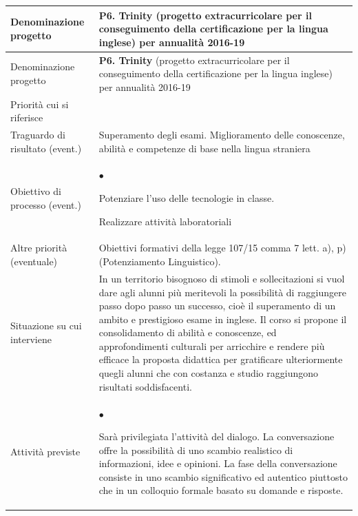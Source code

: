 \documentclass[12pt,a4paper,oneside]{memoir}
\newenvironment{elenco}{\begin{list}{$\bullet$}{%
              \setlength{\leftmargin}{4mm}%
              \setlength{\rightmargin}{1mm}%
               \setlength{\itemindent}{0mm}%
               \setlength{\labelwidth}{2mm}%
               \setlength{\labelsep}{2mm}%
              \setlength{\itemsep}{-\parsep}%
              \setlength{\partopsep}{0pt}%
              \setlength{\topsep}{0pt}%
             \setlength{\parskip}{0pt}%
              }}{\end{list}}
\begin{document}
\vspace{24pt}

\begin{footnotesize}
\begin{longtable}{|>{\raggedright}p{2.5cm}|>{\raggedright\arraybackslash}P{10cm}|}
\hline
{}
\label{P6}Denominazione progetto&\textbf{P6. Trinity} (progetto extracurricolare per il conseguimento della certificazione per la lingua inglese) per annualità 2016-19\\ \hline \endfirsthead
\hline
{}
Denominazione progetto&\textbf{P6. Trinity} (progetto extracurricolare per il conseguimento della certificazione per la lingua inglese) per annualità 2016-19\\ \hline \endhead
{}
\endfoot
\hline
\endlastfoot
Priorità cui si riferisce&\\ \hline
Traguardo di risultato (event.)&Superamento degli esami. Miglioramento delle conoscenze, abilità e competenze di base nella lingua straniera\\ \hline
Obiettivo di processo (event.)&
\begin{elenco}
\item Potenziare l'uso delle tecnologie in classe.
\item Realizzare attività laboratoriali
\end{elenco}\\ \hline
Altre priorità (eventuale)&Obiettivi formativi della legge 107/15 comma 7 lett. a), p) (Potenziamento Linguistico).\\ \hline
Situazione su cui interviene&In un territorio bisognoso di stimoli e sollecitazioni si vuol dare agli alunni più meritevoli la possibilità di raggiungere passo dopo passo un successo, cioè il superamento di un ambito e prestigioso esame in inglese. Il corso si propone il consolidamento di abilità e conoscenze, ed approfondimenti culturali per arricchire e rendere più efficace la proposta didattica per gratificare ulteriormente quegli alunni che con costanza e studio raggiungono risultati soddisfacenti.\\ \hline
Attività previste&
\begin{elenco}
\item Sarà privilegiata l'attività del dialogo. La conversazione offre la possibilità di uno scambio realistico di informazioni, idee e opinioni. La fase della conversazione consiste in uno scambio significativo ed autentico piuttosto che in un colloquio formale basato su domande e risposte.

\end{elenco}
\end{longtable}
\end{footnotesize}
\end{document}
